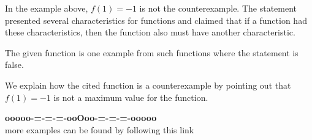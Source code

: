 \documentclass{ximera}
\begin{document}
In the example above, $f(1) = -1$ is not the counterexample. The statement presented several characteristics for functions and claimed that if a function had these characteristics, then the function also must have another characteristic.

The given function is one example from such functions where the statement is false.

We explain how the cited function is a counterexample by pointing out that $f(1) = -1$ is not a maximum value for the function.


























\begin{center}
\textbf{\textcolor{green!50!black}{ooooo-=-=-=-ooOoo-=-=-=-ooooo}} \\

more examples can be found by following this link\\ 

\end{center}
\end{document}
